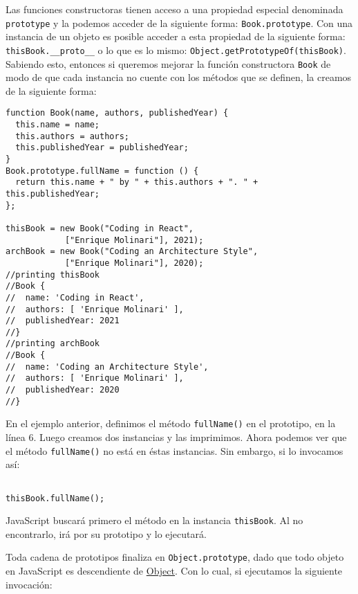 \documentclass[a4paper, oneside, titlepage, 12pt]{paper}
\begin{document}
Las funciones constructoras tienen acceso a una propiedad especial denominada \texttt{prototype} y la podemos acceder de la siguiente forma: \texttt{Book.prototype}. Con una instancia de un objeto es posible acceder a esta propiedad de la siguiente forma: \texttt{thisBook.__proto__} o lo que es lo mismo: \texttt{Object.getPrototypeOf(thisBook)}. Sabiendo esto, entonces si queremos mejorar la función constructora \texttt{Book} de modo de que cada instancia no cuente con los métodos que se definen, la creamos de la siguiente forma:

\begin{verbatim}
function Book(name, authors, publishedYear) {
  this.name = name;
  this.authors = authors;
  this.publishedYear = publishedYear;
}
Book.prototype.fullName = function () {
  return this.name + " by " + this.authors + ". " + this.publishedYear;
};               
               
thisBook = new Book("Coding in React", 
			["Enrique Molinari"], 2021);
archBook = new Book("Coding an Architecture Style", 
			["Enrique Molinari"], 2020);
//printing thisBook
//Book {
//  name: 'Coding in React',
//  authors: [ 'Enrique Molinari' ],
//  publishedYear: 2021
//}
//printing archBook
//Book {
//  name: 'Coding an Architecture Style',
//  authors: [ 'Enrique Molinari' ],
//  publishedYear: 2020
//}
\end{verbatim}

En el ejemplo anterior, definimos el método \texttt{fullName()} en el prototipo, en la línea 6. Luego creamos dos instancias y las imprimimos. Ahora podemos ver que el método \texttt{fullName()} no está en éstas instancias. Sin embargo, si lo invocamos así:

\begin{verbatim}

thisBook.fullName();
\end{verbatim}

JavaScript buscará primero el método en la instancia \texttt{thisBook}. Al no encontrarlo, irá por su prototipo y lo ejecutará.
\newline

Toda cadena de prototipos finaliza en \texttt{Object.prototype}, dado que todo objeto en JavaScript es descendiente de \href{https://developer.mozilla.org/es/docs/Web/JavaScript/Reference/Global_Objects/Object}{Object}. Con lo cual, si ejecutamos la siguiente invocación:
\end{document}
